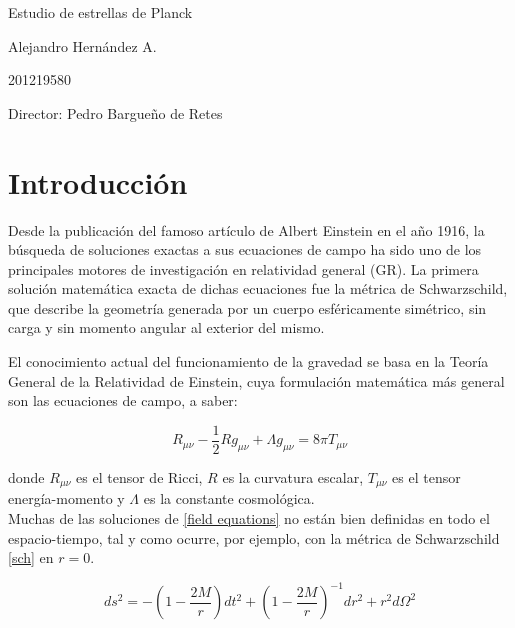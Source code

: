 \documentclass{article}
\numberwithin{equation}{section}
\begin{document}
\begin{center}
\Huge
Estudio de estrellas de Planck 

\vspace{3mm}
\Large Alejandro Hernández A.

\large
201219580


\vspace{2mm}
\Large
Director: Pedro Bargueño de Retes

\normalsize
\vspace{2mm}

\date{}
\end{center}


\normalsize
\section{Introducción}

Desde la publicación del famoso artículo \cite{einstein} de Albert Einstein en el año 1916, la búsqueda de soluciones exactas a sus ecuaciones de campo ha sido uno de los principales motores de investigación en relatividad general (GR). La primera solución matemática exacta de dichas ecuaciones fue la métrica de Schwarzschild, que describe la geometría generada por un cuerpo esféricamente simétrico, sin carga y sin momento angular al exterior del mismo.
   
El conocimiento actual del funcionamiento de la gravedad se basa en la Teoría General de la Relatividad de Einstein, cuya formulación matemática más general son las ecuaciones de campo, a saber:

\begin{equation}
\label{field equations}
R_{\mu \nu} - \frac{1}{2} R g_{\mu \nu} + \Lambda g_{\mu \nu} = 8 \pi T_{\mu \nu}
\end{equation}

donde $R_{\mu \nu}$ es el tensor de Ricci, $R$ es la curvatura escalar, $T_{\mu \nu}$ es el tensor energía-momento y $\Lambda$ es la constante cosmológica.\\

Muchas de las soluciones de \eqref{field equations} no están bien definidas en todo el espacio-tiempo, tal y como ocurre, por ejemplo, con la métrica de Schwarzschild \eqref{sch}  en $r = 0$.

\begin{equation}
\label{sch}
ds^2 = -\left( 1 - \frac{2M}{r} \right) dt^2 + \left( 1 - \frac{2M}{r} \right)^{-1} dr^2 + r^2d\Omega ^2
\end{equation}
\end{document}
